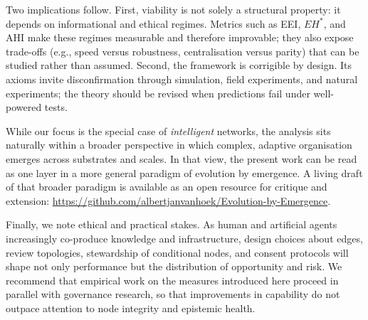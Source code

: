 \documentclass[12pt]{article}
\begin{document}
Two implications follow. First, viability is not solely a structural property: it depends on informational and ethical regimes. Metrics such as EEI, $EH^{\ast}$, and AHI make these regimes measurable and therefore improvable; they also expose trade-offs (e.g., speed versus robustness, centralisation versus parity) that can be studied rather than assumed. Second, the framework is corrigible by design. Its axioms invite disconfirmation through simulation, field experiments, and natural experiments; the theory should be revised when predictions fail under well-powered tests.

While our focus is the special case of \emph{intelligent} networks, the analysis sits naturally within a broader perspective in which complex, adaptive organisation emerges across substrates and scales. In that view, the present work can be read as one layer in a more general paradigm of evolution by emergence. A living draft of that broader paradigm is available as an open resource for critique and extension: \url{https://github.com/albertjanvanhoek/Evolution-by-Emergence}.

Finally, we note ethical and practical stakes. As human and artificial agents increasingly co-produce knowledge and infrastructure, design choices about edges, review topologies, stewardship of conditional nodes, and consent protocols will shape not only performance but the distribution of opportunity and risk. We recommend that empirical work on the measures introduced here proceed in parallel with governance research, so that improvements in capability do not outpace attention to node integrity and epistemic health.



\end{document}
